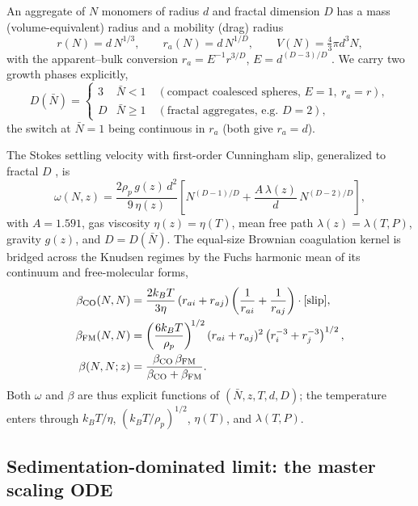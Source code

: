 \documentclass[11pt]{article}
\newcommand{\Nbar}{\bar{N}}
\newcommand{\Df}{D}
\begin{document}
An aggregate of $N$ monomers of radius $d$ and fractal dimension $\Df$ has a
mass (volume-equivalent) radius and a mobility (drag) radius
\begin{equation}
  r(N) = d\,N^{1/3}, \qquad r_a(N) = d\,N^{1/\Df},
  \qquad V(N)=\tfrac{4}{3}\pi d^3 N,
  \label{eq:geom}
\end{equation}
with the apparent--bulk conversion $r_a=E^{-1}r^{3/\Df}$,
$E=d^{(\Df-3)/\Df}$ \citep{Burgalat2017}. We carry two growth phases explicitly,
\begin{equation}
  \Df(\Nbar)=
  \begin{cases}
    3 & \Nbar<1 \quad(\text{compact coalesced spheres, } E=1,\ r_a=r),\\
    \Df & \Nbar\ge1 \quad(\text{fractal aggregates, e.g. } \Df=2),
  \end{cases}
  \label{eq:twophase}
\end{equation}
the switch at $\Nbar=1$ being continuous in $r_a$ (both give $r_a=d$).

The Stokes settling velocity with first-order Cunningham slip, generalized to
fractal $\Df$ \citep[Eq.~29]{Burgalat2017}, is
\begin{equation}
  \omega(N,z) = \frac{2\rho_p\, g(z)\, d^2}{9\,\eta(z)}
  \left[ N^{(\Df-1)/\Df} + \frac{A\,\lambda(z)}{d}\,N^{(\Df-2)/\Df}\right],
  \label{eq:settle}
\end{equation}
with $A=1.591$, gas viscosity $\eta(z)=\eta(T)$, mean free path
$\lambda(z)=\lambda(T,P)$, gravity $g(z)$, and $\Df=\Df(\Nbar)$. The equal-size
Brownian coagulation kernel is bridged across the Knudsen regimes by the Fuchs
harmonic mean of its continuum and free-molecular forms,
\begin{align}
  \beta_{\rm CO}(N,N) &= \frac{2 k_B T}{3\eta}\,(r_{ai}+r_{aj})
    \left(\frac{1}{r_{ai}}+\frac{1}{r_{aj}}\right)\cdot[\text{slip}],
    \label{eq:bco}\\
  \beta_{\rm FM}(N,N) &= \left(\frac{6 k_B T}{\rho_p}\right)^{\!1/2}
    (r_{ai}+r_{aj})^2 \left(r_i^{-3}+r_j^{-3}\right)^{1/2},
    \label{eq:bfm}\\
  \beta(N,N;z) &= \frac{\beta_{\rm CO}\,\beta_{\rm FM}}
    {\beta_{\rm CO}+\beta_{\rm FM}}.
    \label{eq:bridge}
\end{align}
Both $\omega$ and $\beta$ are thus explicit functions of $(\Nbar,z,T,d,\Df)$; the
temperature enters through $k_BT/\eta$, $(k_BT/\rho_p)^{1/2}$, $\eta(T)$, and
$\lambda(T,P)$.

\subsection{Sedimentation-dominated limit: the master scaling ODE}
\end{document}
